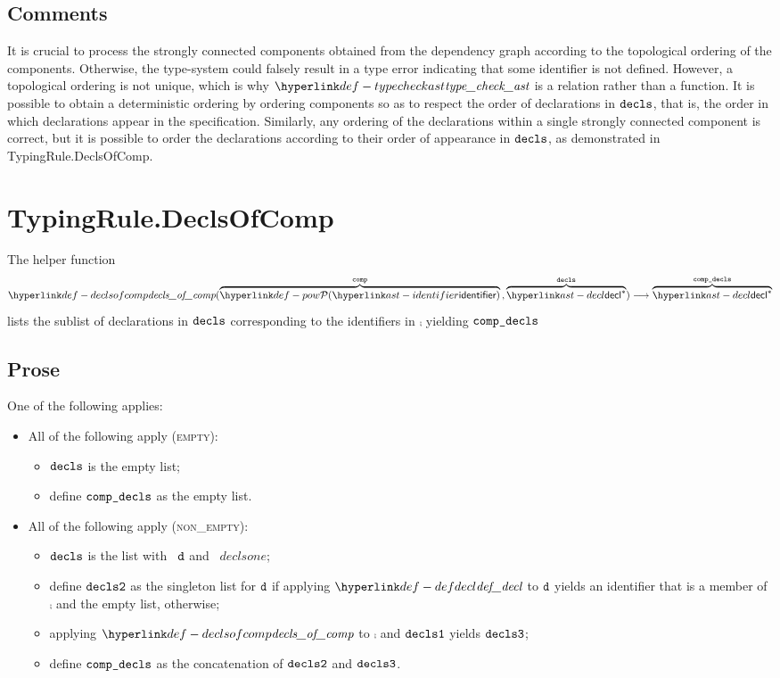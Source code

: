\subsection{Comments}
It is crucial to process the strongly connected components obtained from the dependency graph
according to the topological ordering of the components. Otherwise, the type-system could
falsely result in a type error indicating that some identifier is not defined.
However, a topological ordering is not unique, which is why $\typecheckast$ is a relation rather than
a function.
It is possible to obtain a deterministic ordering by ordering components so as to respect
the order of declarations in $\texttt{decls}$, that is,
the order in which declarations appear in the specification.
Similarly, any ordering of the declarations within a single strongly connected component is correct,
but it is possible to order the declarations according to their order of appearance in $\texttt{decls}$,
as demonstrated in TypingRule.DeclsOfComp.


\section{TypingRule.DeclsOfComp \label{sec:TypingRule.DeclsOfComp}}
\hypertarget{def-declsofcomp}{}
The helper function
\[
\declsofcomp(
  \overname{\pow{\identifier}}{\comp} \aslsep
  \overname{\decl^*}{\decls}
) \aslto \overname{\decl^*}{\compdecls}
\]
lists the sublist of declarations in $\texttt{decls}$ corresponding to the identifiers in $\comp$
yielding $\texttt{comp\_decls}$

\subsection{Prose}
One of the following applies:
\begin{itemize}
  \item All of the following apply (\textsc{empty}):
  \begin{itemize}
    \item $\texttt{decls}$ is the empty list;
    \item define $\texttt{comp\_decls}$ as the empty list.
  \end{itemize}

  \item All of the following apply (\textsc{non\_empty}):
  \begin{itemize}
    \item $\texttt{decls}$ is the list with \head\ $\texttt{d}$ and \tail\ $declsone$;
    \item define $\texttt{decls2}$ as the singleton list for $\texttt{d}$ if applying $\defdecl$ to $\texttt{d}$ yields an identifier
          that is a member of $\comp$ and the empty list, otherwise;
    \item applying $\declsofcomp$ to $\comp$ and $\texttt{decls1}$ yields $\texttt{decls3}$;
    \item define $\texttt{comp\_decls}$ as the concatenation of $\texttt{decls2}$ and $\texttt{decls3}$.
  \end{itemize}
\end{itemize}

